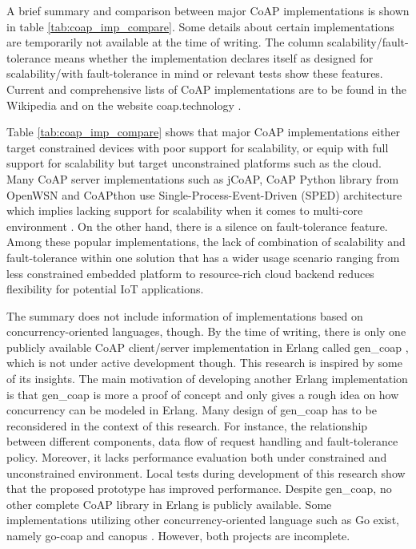 A brief summary and comparison between major CoAP implementations is shown in table \ref{tab:coap_imp_compare}. Some details about certain implementations are temporarily not available at the time of writing. The column scalability/fault-tolerance means whether the implementation declares itself as designed for scalability/with fault-tolerance in mind or relevant tests show these features. Current and comprehensive lists of CoAP implementations are to be found in the Wikipedia \cite{coap_wiki} and on the website coap.technology \cite{coap_tech}.

Table \ref{tab:coap_imp_compare} shows that major CoAP implementations either target constrained devices with poor support for scalability, or equip with full support for scalability but target unconstrained platforms such as the cloud. Many CoAP server implementations such as jCoAP, CoAP Python library from OpenWSN and CoAPthon use Single-Process-Event-Driven (SPED) architecture which implies lacking support for scalability when it comes to multi-core environment \cite{kovatsch2015scalable}. On the other hand, there is a silence on fault-tolerance feature. Among these popular implementations, the lack of combination of scalability and fault-tolerance within one solution that has a wider usage scenario ranging from less constrained embedded platform to resource-rich cloud backend reduces flexibility for potential IoT applications.

The summary does not include information of implementations based on concurrency-oriented languages, though. By the time of writing, there is only one publicly available CoAP client/server implementation in Erlang called gen\_coap \cite{gen_coap}, which is not under active development though. This research is inspired by some of its insights. The main motivation of developing another Erlang implementation is that gen\_coap is more a proof of concept and only gives a rough idea on how concurrency can be modeled in Erlang. Many design of gen\_coap has to be reconsidered in the context of this research. For instance, the relationship between different components, data flow of request handling and fault-tolerance policy. Moreover, it lacks performance evaluation both under constrained and unconstrained environment. Local tests during development of this research show that the proposed prototype has improved performance. Despite gen\_coap, no other complete CoAP library in Erlang is publicly available. Some implementations utilizing other concurrency-oriented language such as Go \cite{go} exist, namely go-coap \cite{go-coap} and canopus \cite{canopus}. However, both projects are incomplete.
 

